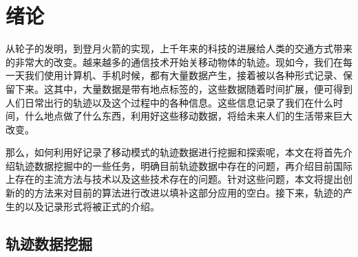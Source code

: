 
\chapter{绪论}
\label{chapter:introduction}


从轮子的发明，到登月火箭的实现，上千年来的科技的进展给人类的交通方式带来的非常大的改变。越来越多的通信技术开始关移动物体的轨迹。现如今，我们在每一天我们使用计算机、手机时候，都有大量数据产生，接着被以各种形式记录、保留下来。这其中，大量数据是带有地点标签的，这些数据随着时间扩展，便可得到人们日常出行的轨迹以及这个过程中的各种信息。这些信息记录了我们在什么时间，什么地点做了什么东西，利用好这些移动数据，将给未来人们的生活带来巨大改变。

那么，如何利用好记录了移动模式的轨迹数据进行挖掘和探索呢，本文在将首先介绍轨迹数据挖掘中的一些任务，明确目前轨迹数据中存在的问题，再介绍目前国际上存在的主流方法与技术以及这些技术存在的问题。针对这些问题，本文将提出创新的的方法来对目前的算法进行改进以填补这部分应用的空白。接下来，轨迹的产生的以及记录形式将被正式的介绍。



\section{轨迹数据挖掘}
